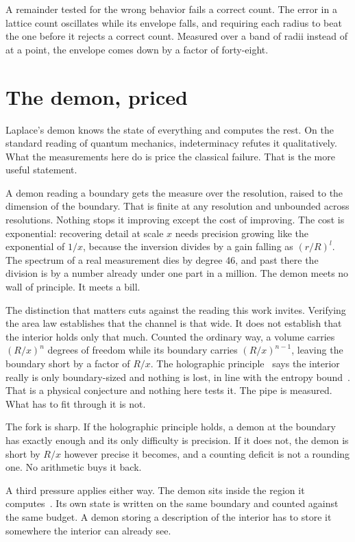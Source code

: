 A remainder tested for the wrong behavior fails a correct count. The error in a lattice count oscillates while its envelope falls, and requiring each radius to beat the one before it rejects a correct count. Measured over a band of radii instead of at a point, the envelope comes down by a factor of forty-eight.

\section{The demon, priced}

Laplace's demon knows the state of everything and computes the rest. On the standard reading of
quantum mechanics, indeterminacy refutes it qualitatively. What the measurements here do is price the classical failure. That is the more
useful statement.

A demon reading a boundary gets the measure over the resolution, raised to the dimension of the
boundary. That is finite at any resolution and unbounded across resolutions. Nothing stops it
improving except the cost of improving. The cost is exponential: recovering detail at scale $x$
needs precision growing like the exponential of $1/x$, because the inversion divides by a gain
falling as $(r/R)^l$. The spectrum of a real measurement dies by degree 46, and past there the
division is by a number already under one part in a million. The demon meets no wall of principle.
It meets a bill.

The distinction that matters cuts against the reading this work invites. Verifying the area law
establishes that the channel is that wide. It does not establish that the interior holds only that
much. Counted the ordinary way, a volume carries $(R/x)^n$ degrees of freedom while its boundary
carries $(R/x)^{n-1}$, leaving the boundary short by a factor of $R/x$. The holographic principle~\cite{src:t-Hooft-1993,src:Susskind-1995} says
the interior really is only boundary-sized and nothing is lost, in line with the entropy bound~\cite{src:Bekenstein-1981}. That is a physical conjecture and
nothing here tests it. The pipe is measured. What has to fit through it is not.

The fork is sharp. If the holographic principle holds, a demon at the boundary has exactly enough
and its only difficulty is precision. If it does not, the demon is short by $R/x$ however precise it
becomes, and a counting deficit is not a rounding one. No arithmetic buys it back.

A third pressure applies either way. The demon sits inside the region it computes~\cite{src:Wolpert-2008}. Its own state
is written on the same boundary and counted against the same budget. A demon storing a description
of the interior has to store it somewhere the interior can already see.


